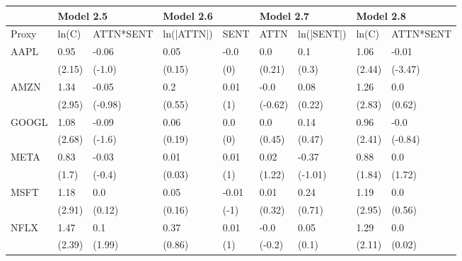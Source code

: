 \begin{tabular}{lllllllll}
\toprule
{} & \multicolumn{2}{l}{Model 2.5} & \multicolumn{2}{l}{Model 2.6} & \multicolumn{2}{l}{Model 2.7} & \multicolumn{2}{l}{Model 2.8} \\
\midrule
Proxy &     ln(C) &  ATTN*SENT &  ln(|ATTN|) &   SENT &      ATTN &  ln(|SENT|) &     ln(C) &  ATTN*SENT \\
AAPL  &      0.95 &      -0.06 &        0.05 &   -0.0 &       0.0 &         0.1 &      1.06 &      -0.01 \\
      &    (2.15) &     (-1.0) &      (0.15) &    (0) &    (0.21) &       (0.3) &    (2.44) &    (-3.47) \\
AMZN  &      1.34 &      -0.05 &         0.2 &   0.01 &      -0.0 &        0.08 &      1.26 &        0.0 \\
      &    (2.95) &    (-0.98) &      (0.55) &    (1) &   (-0.62) &      (0.22) &    (2.83) &     (0.62) \\
GOOGL &      1.08 &      -0.09 &        0.06 &    0.0 &       0.0 &        0.14 &      0.96 &       -0.0 \\
      &    (2.68) &     (-1.6) &      (0.19) &    (0) &    (0.45) &      (0.47) &    (2.41) &    (-0.84) \\
META  &      0.83 &      -0.03 &        0.01 &   0.01 &      0.02 &       -0.37 &      0.88 &        0.0 \\
      &     (1.7) &     (-0.4) &      (0.03) &    (1) &    (1.22) &     (-1.01) &    (1.84) &     (1.72) \\
MSFT  &      1.18 &        0.0 &        0.05 &  -0.01 &      0.01 &        0.24 &      1.19 &        0.0 \\
      &    (2.91) &     (0.12) &      (0.16) &   (-1) &    (0.32) &      (0.71) &    (2.95) &     (0.56) \\
NFLX  &      1.47 &        0.1 &        0.37 &   0.01 &      -0.0 &        0.05 &      1.29 &        0.0 \\
      &    (2.39) &     (1.99) &      (0.86) &    (1) &    (-0.2) &       (0.1) &    (2.11) &     (0.02) \\
\bottomrule
\end{tabular}
